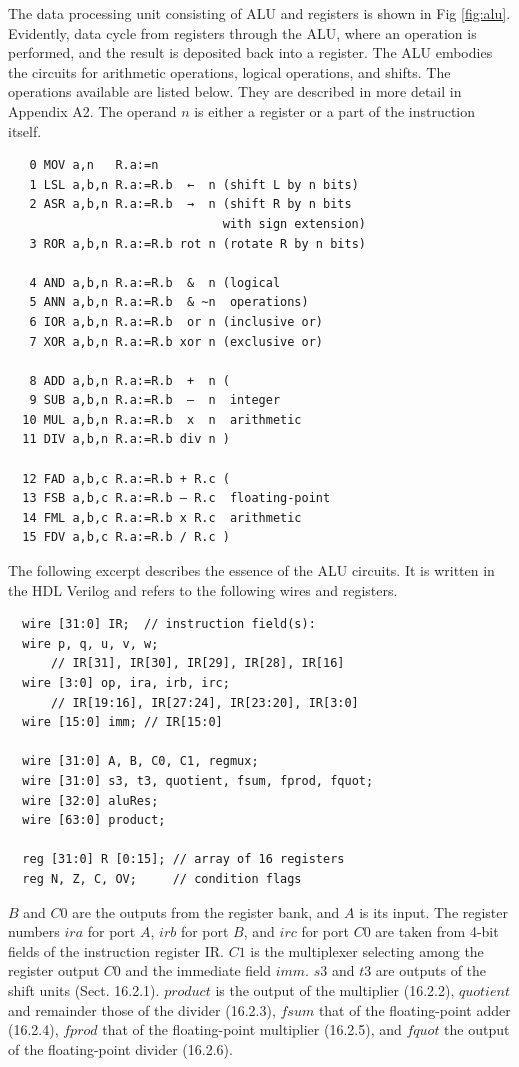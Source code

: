 The data processing unit consisting of ALU and registers is shown in Fig \ref{fig:alu}. Evidently, data
cycle from registers through the ALU, where an operation is performed, and the result is deposited
back into a register. The ALU embodies the circuits for arithmetic operations, logical operations,
and shifts. The operations available are listed below. They are described in more detail in
Appendix A2. The operand $n$ is either a register or a part of the instruction itself.

\begin{verbatim}
   0 MOV a,n   R.a:=n
   1 LSL a,b,n R.a:=R.b  ←  n (shift L by n bits)
   2 ASR a,b,n R.a:=R.b  →  n (shift R by n bits
                              with sign extension)
   3 ROR a,b,n R.a:=R.b rot n (rotate R by n bits)

   4 AND a,b,n R.a:=R.b  &  n (logical
   5 ANN a,b,n R.a:=R.b  & ~n  operations)
   6 IOR a,b,n R.a:=R.b  or n (inclusive or)
   7 XOR a,b,n R.a:=R.b xor n (exclusive or)

   8 ADD a,b,n R.a:=R.b  +  n (
   9 SUB a,b,n R.a:=R.b  –  n  integer
  10 MUL a,b,n R.a:=R.b  x  n  arithmetic
  11 DIV a,b,n R.a:=R.b div n )

  12 FAD a,b,c R.a:=R.b + R.c (
  13 FSB a,b,c R.a:=R.b – R.c  floating-point
  14 FML a,b,c R.a:=R.b x R.c  arithmetic
  15 FDV a,b,c R.a:=R.b / R.c )
\end{verbatim}

The following excerpt describes the essence of the ALU circuits. It is written in the HDL Verilog
and refers to the following wires and registers.

\begin{verbatim}
  wire [31:0] IR;  // instruction field(s):
  wire p, q, u, v, w;
      // IR[31], IR[30], IR[29], IR[28], IR[16]
  wire [3:0] op, ira, irb, irc;
      // IR[19:16], IR[27:24], IR[23:20], IR[3:0]
  wire [15:0] imm; // IR[15:0]

  wire [31:0] A, B, C0, C1, regmux;
  wire [31:0] s3, t3, quotient, fsum, fprod, fquot;
  wire [32:0] aluRes;
  wire [63:0] product;

  reg [31:0] R [0:15]; // array of 16 registers
  reg N, Z, C, OV;     // condition flags
\end{verbatim}

$B$ and $C0$ are the outputs from the register bank, and $A$ is its input. The register numbers $ira$ for port
$A$, $irb$ for port $B$, and $irc$ for port $C0$ are taken from 4-bit fields of the instruction register IR. $C1$ is the
multiplexer selecting among the register output $C0$ and the immediate field $imm$. $s3$ and $t3$ are
outputs of the shift units (Sect. 16.2.1). $product$ is the output of the multiplier (16.2.2), $quotient$ and
remainder those of the divider (16.2.3), $fsum$ that of the floating-point adder (16.2.4), $fprod$ that of the
floating-point multiplier (16.2.5), and $fquot$ the output of the floating-point divider (16.2.6).

